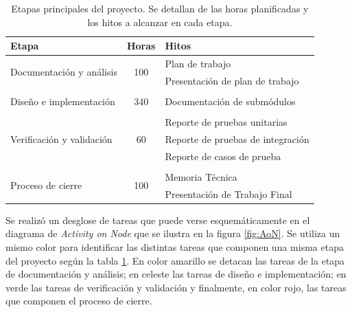 \begin{table}[ht]
\centering
\caption[Etapas principales del proyecto]{Etapas principales del proyecto. Se detallan de las horas planificadas y los hitos a alcanzar en cada etapa.}
\label{tab:planificacion}
\begin{tabular}{lcl}
\toprule
\textbf{Etapa}                            & \textbf{Horas}       & \textbf{Hitos}                                \\ \midrule
\multirow{2}{*}{Documentación y análisis} & \multirow{2}{*}{100} & Plan de trabajo                             \\
                                          &                      & Presentación de plan de trabajo \vspace{5px}\\
                                          & \multicolumn{1}{l}{} &                                             \\ 
Diseño e implementación                   & 340                  & Documentación de submódulos  \vspace{5px}   \\
                                          & \multicolumn{1}{l}{} &                                             \\ 
               							  &                      & Reporte de pruebas unitarias                \\
Verificación y validación                 & 60                   & Reporte de pruebas de integración           \\
                                          &                      & Reporte de casos de prueba   \vspace{5px}   \\
                                          & \multicolumn{1}{l}{} &                                             \\ 
\multirow{2}{*}{Proceso de cierre}        & \multirow{2}{*}{100} & Memoria Técnica                             \\
                                          &                      & Presentación de Trabajo Final               \\ \bottomrule
\end{tabular}
\end{table}

Se realizó un desglose de tareas que puede verse esquemáticamente en el diagrama de \textit{Activity on Node} que se ilustra en la figura \ref{fig:AoN}. Se utiliza un mismo color para identificar las distintas tareas que componen una misma etapa del proyecto según la tabla \ref{tab:planificacion}. En color amarillo se detacan las tareas de la etapa de documentación y análisis; en celeste las tareas de diseño e implementación; en verde las tareas de verificación y validación y finalmente, en color rojo, las tareas que componen el proceso de cierre. 


